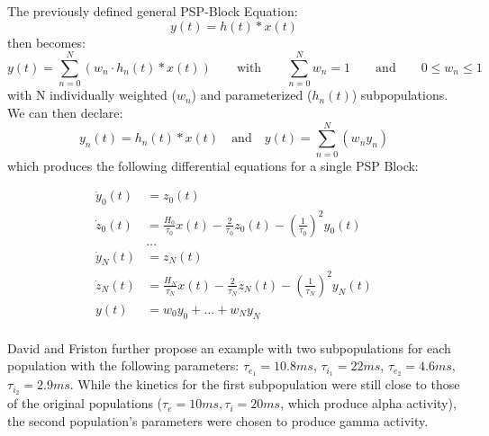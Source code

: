 The previously defined general PSP-Block Equation:
\[y(t)=h(t)\ast x(t)\]
then becomes:
\[y(t)=\sum_{n=0}^{N}{(w_n \cdot h_n(t) \ast x(t))} \hspace{2em}
\text{with}
\hspace{2em} \sum_{n=0}^{N}w_n = 1 \hspace{2em}
\text{and}
\hspace{2em} 0 \leq w_n \leq 1\]
with N individually weighted ($w_n$) and parameterized ($h_n(t)$) subpopulations. \\
We can then declare:
\[y_n(t) = h_n(t) \ast x(t) \quad \text{and} \quad y(t) = \sum_{n=0}^{N} (w_{n}y_n)\]
which produces the following differential equations for a single PSP Block:

\begin{equation}
    \begin{aligned}
        \dot{y}_0(t) &= z_0(t) \\
        \dot{z}_0(t) &= \frac{H_0}{\tau_0} x(t) - \frac{2}{\tau_0}z_0(t) - \left(\frac{1}{\tau_0}\right)^{2}y_0(t)\\
        &\dots\\
        \dot{y}_N(t) &= z_N(t) \\
        \dot{z}_N(t) &= \frac{H_N}{\tau_N} x(t) - \frac{2}{\tau_N}z_N(t) - \left(\frac{1}{\tau_N}\right)^{2}y_N(t)\\
        y(t)         &= w_{0}y_0 + \dots + w_{N}y_N\\
    \end{aligned}\label{eq:davidfriston_subpops}
\end{equation}




David and Friston further propose an example with two subpopulations for each population with
the following parameters: $\tau_{e_1}=10.8ms$, $\tau_{i_1}=22ms$, $\tau_{e_2}=4.6ms$, $\tau_{i_2}=2.9ms$.
While the kinetics for the first subpopulation were still close
to those of the original populations ($\tau_e=10ms, \tau_i=20ms$, which produce alpha activity),
the second population's parameters were chosen to produce gamma activity.


